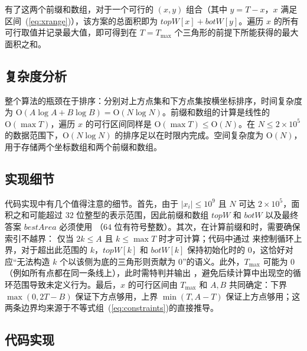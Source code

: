有了这两个前缀和数组，对于一个可行的 $(x, y)$ 组合（其中 $y = T - x$，$x$ 满足区间~(\ref{eq:xrange})），该方案的总面积即为 $\mathit{topW}[x] + \mathit{botW}[y]$。遍历 $x$ 的所有可行取值并记录最大值，即可得到在 $T = T_{\max}$ 个三角形的前提下所能获得的最大面积之和。

\subsection{复杂度分析}

整个算法的瓶颈在于排序：分别对上方点集和下方点集按横坐标排序，时间复杂度为 $\mathrm{O}(A \log A + B \log B) = \mathrm{O}(N \log N)$。前缀和数组的计算是线性的 $\mathrm{O}(\max T)$，遍历 $x$ 的可行区间同样是 $\mathrm{O}(\max T) \le \mathrm{O}(N)$。在 $N \le 2 \times 10^5$ 的数据范围下，$\mathrm{O}(N \log N)$ 的排序足以在时限内完成。空间复杂度为 $\mathrm{O}(N)$，用于存储两个坐标数组和两个前缀和数组。

\subsection{实现细节}

代码实现中有几个值得注意的细节。首先，由于 $|x_i| \le 10^9$ 且 $N$ 可达 $2 \times 10^5$，面积之和可能超过 $32$ 位整型的表示范围，因此前缀和数组 $\mathit{topW}$ 和 $\mathit{botW}$ 以及最终答案 $\mathit{bestArea}$ 必须使用 （$64$ 位有符号整数）。其次，在计算前缀和时，需要确保索引不越界： 仅当 $2k \le A$ 且 $k \le \max T$ 时才可计算；代码中通过  来控制循环上界，对于超出此范围的 $k$，$\mathit{topW}[k]$ 和 $\mathit{botW}[k]$ 保持初始化时的 $0$，这恰好对应“无法构造 $k$ 个以该侧为底的三角形则贡献为 $0$”的语义。此外，$T_{\max}$ 可能为 $0$（例如所有点都在同一条线上），此时需特判并输出 ，避免后续计算中出现空的循环范围导致未定义行为。最后，$x$ 的可行区间由 $T_{\max}$ 和 $A, B$ 共同确定：下界 $\max(0, 2T - B)$ 保证下方点够用，上界 $\min(T, A - T)$ 保证上方点够用；这两条边界均来源于不等式组~(\ref{eq:constraints})的直接推导。

\subsection{代码实现}
\inputminted{c++}{../src/p06_independent_triangles.cpp}
